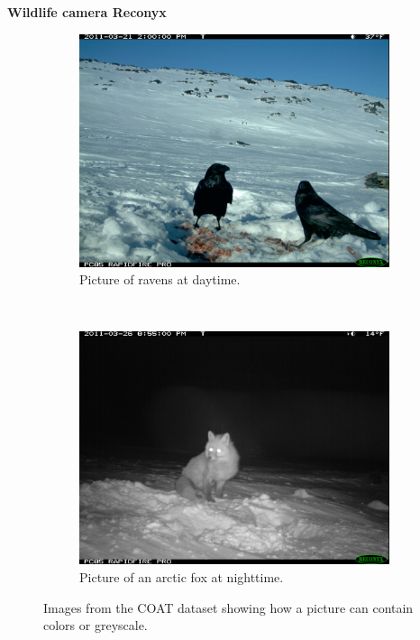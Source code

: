 \documentclass[USenglish]{uit-thesis}
\begin{document}
\textbf{Wildlife camera Reconyx}

\begin{figure}[t!]
    \centering
    \begin{subfigure}[t]{0.5\textwidth}
        \includegraphics[width=\textwidth]{IMG_0040.JPG}
        \caption{Picture of ravens at daytime.}
    \end{subfigure}%
    ~ 
    \begin{subfigure}[t]{0.5\textwidth}
        \includegraphics[width=\textwidth]{IMG_1562.JPG}
        \caption{Picture of an arctic fox at nighttime.}
    \end{subfigure}
    \caption{Images from the COAT dataset showing how a picture can contain colors or greyscale.}
    \label{fig:pictures}
\end{figure}
\end{document}
